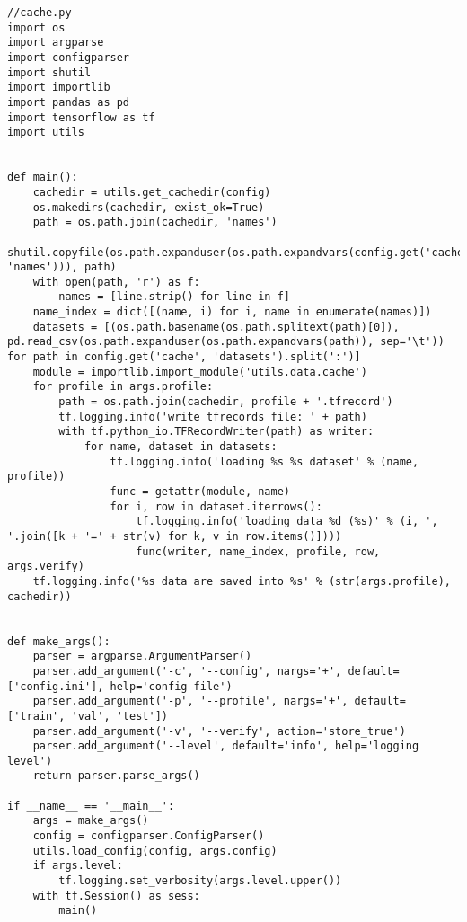 \pagebreak
\begin{lstlisting}
//cache.py
import os
import argparse
import configparser
import shutil
import importlib
import pandas as pd
import tensorflow as tf
import utils


def main():
    cachedir = utils.get_cachedir(config)
    os.makedirs(cachedir, exist_ok=True)
    path = os.path.join(cachedir, 'names')
    shutil.copyfile(os.path.expanduser(os.path.expandvars(config.get('cache', 'names'))), path)
    with open(path, 'r') as f:
        names = [line.strip() for line in f]
    name_index = dict([(name, i) for i, name in enumerate(names)])
    datasets = [(os.path.basename(os.path.splitext(path)[0]), pd.read_csv(os.path.expanduser(os.path.expandvars(path)), sep='\t')) for path in config.get('cache', 'datasets').split(':')]
    module = importlib.import_module('utils.data.cache')
    for profile in args.profile:
        path = os.path.join(cachedir, profile + '.tfrecord')
        tf.logging.info('write tfrecords file: ' + path)
        with tf.python_io.TFRecordWriter(path) as writer:
            for name, dataset in datasets:
                tf.logging.info('loading %s %s dataset' % (name, profile))
                func = getattr(module, name)
                for i, row in dataset.iterrows():
                    tf.logging.info('loading data %d (%s)' % (i, ', '.join([k + '=' + str(v) for k, v in row.items()])))
                    func(writer, name_index, profile, row, args.verify)
    tf.logging.info('%s data are saved into %s' % (str(args.profile), cachedir))


def make_args():
    parser = argparse.ArgumentParser()
    parser.add_argument('-c', '--config', nargs='+', default=['config.ini'], help='config file')
    parser.add_argument('-p', '--profile', nargs='+', default=['train', 'val', 'test'])
    parser.add_argument('-v', '--verify', action='store_true')
    parser.add_argument('--level', default='info', help='logging level')
    return parser.parse_args()

if __name__ == '__main__':
    args = make_args()
    config = configparser.ConfigParser()
    utils.load_config(config, args.config)
    if args.level:
        tf.logging.set_verbosity(args.level.upper())
    with tf.Session() as sess:
        main()


\end{lstlisting}

